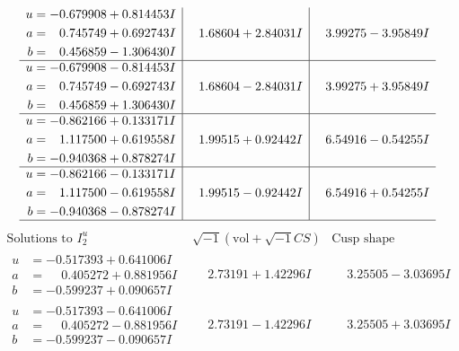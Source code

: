 \documentclass[1p]{elsarticle_modified}
\theoremstyle{definition}
\newcommand{\I}{\sqrt{-1}}
\begin{document}
$$\begin{array}{c|c|c}
\begin{aligned}
u &= -0.679908 + 0.814453 I \\
a &= \phantom{-}0.745749 + 0.692743 I \\
b &= \phantom{-}0.456859 - 1.306430 I\end{aligned}
 & \phantom{-}1.68604 + 2.84031 I & \phantom{-}3.99275 - 3.95849 I \\ \hline\begin{aligned}
u &= -0.679908 - 0.814453 I \\
a &= \phantom{-}0.745749 - 0.692743 I \\
b &= \phantom{-}0.456859 + 1.306430 I\end{aligned}
 & \phantom{-}1.68604 - 2.84031 I & \phantom{-}3.99275 + 3.95849 I \\ \hline\begin{aligned}
u &= -0.862166 + 0.133171 I \\
a &= \phantom{-}1.117500 + 0.619558 I \\
b &= -0.940368 + 0.878274 I\end{aligned}
 & \phantom{-}1.99515 + 0.92442 I & \phantom{-}6.54916 - 0.54255 I \\ \hline\begin{aligned}
u &= -0.862166 - 0.133171 I \\
a &= \phantom{-}1.117500 - 0.619558 I \\
b &= -0.940368 - 0.878274 I\end{aligned}
 & \phantom{-}1.99515 - 0.92442 I & \phantom{-}6.54916 + 0.54255 I\\
 \hline 
 \end{array}$$\newpage$$\begin{array}{c|c|c}  
\text{Solutions to }I^u_{2}& \I (\text{vol} + \sqrt{-1}CS) & \text{Cusp shape}\\
 \hline 
\begin{aligned}
u &= -0.517393 + 0.641006 I \\
a &= \phantom{-}0.405272 + 0.881956 I \\
b &= -0.599237 + 0.090657 I\end{aligned}
 & \phantom{-}2.73191 + 1.42296 I & \phantom{-}3.25505 - 3.03695 I \\ \hline\begin{aligned}
u &= -0.517393 - 0.641006 I \\
a &= \phantom{-}0.405272 - 0.881956 I \\
b &= -0.599237 - 0.090657 I\end{aligned}
 & \phantom{-}2.73191 - 1.42296 I & \phantom{-}3.25505 + 3.03695 I \\ \hline\begin{aligned}

\end{aligned}
\end{array}$$
\end{document}
